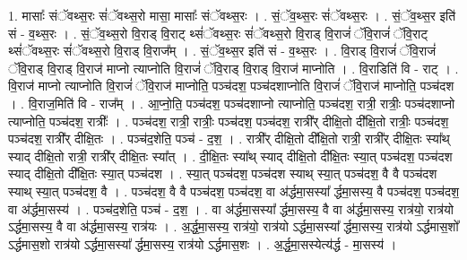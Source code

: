 \documentclass[17pt]{extarticle}
\begin{document}
1. मासाः᳚ संॅवथ्स॒रः सं॑ॅवथ्स॒रो मासा॒ मासाः᳚ संॅवथ्स॒रः । . सं॒ॅव॒थ्स॒रः सं॑ॅवथ्स॒रः । . सं॒ॅव॒थ्स॒र इति॑ सं - व॒थ्स॒रः । . सं॒ॅव॒थ्स॒रो वि॒राड् वि॒राट् थ्सं॑ॅवथ्स॒रः सं॑ॅवथ्स॒रो वि॒राड् वि॒राजं॑ ॅवि॒राजं॑ ॅवि॒राट् 
थ्सं॑ॅवथ्स॒रः सं॑ॅवथ्स॒रो वि॒राड् वि॒राज᳚म् । . सं॒ॅव॒थ्स॒र इति॑ सं - व॒थ्स॒रः । . वि॒राड् वि॒राजं॑ ॅवि॒राजं॑ ॅवि॒राड् वि॒राड् वि॒राज॑ माप्नो त्याप्नोति वि॒राजं॑ ॅवि॒राड् वि॒राड् वि॒राज॑ माप्नोति । . वि॒राडिति॑ वि - राट् । . वि॒राज॑ माप्नो त्याप्नोति वि॒राजं॑ ॅवि॒राज॑ माप्नोति॒ पञ्च॑दश॒ पञ्च॑दशाप्नोति वि॒राजं॑ ॅवि॒राज॑ माप्नोति॒ पञ्च॑दश । . वि॒राज॒मिति॑ वि - राज᳚म् । . आ॒प्नो॒ति॒ पञ्च॑दश॒ पञ्च॑दशाप्नो त्याप्नोति॒ पञ्च॑दश॒ रात्री॒ रात्रीः॒ पञ्च॑दशाप्नो त्याप्नोति॒ पञ्च॑दश॒ रात्रीः᳚ । . पञ्च॑दश॒ रात्री॒ रात्रीः॒ पञ्च॑दश॒ पञ्च॑दश॒ रात्री᳚र् दीक्षि॒तो दी᳚क्षि॒तो रात्रीः॒ पञ्च॑दश॒ पञ्च॑दश॒ रात्री᳚र् दीक्षि॒तः । . पञ्च॑द॒शेति॒ पञ्च॑ - द॒श॒ । . रात्री᳚र् दीक्षि॒तो दी᳚क्षि॒तो रात्री॒ रात्री᳚र् दीक्षि॒तः स्या᳚थ् स्याद् दीक्षि॒तो रात्री॒ रात्री᳚र् दीक्षि॒तः स्या᳚त् । . दी॒क्षि॒तः स्या᳚थ् स्याद् दीक्षि॒तो दी᳚क्षि॒तः स्या॒त् पञ्च॑दश॒ पञ्च॑दश स्याद् दीक्षि॒तो दी᳚क्षि॒तः स्या॒त् पञ्च॑दश । . स्या॒त् पञ्च॑दश॒ पञ्च॑दश स्याथ् स्या॒त् पञ्च॑दश॒ वै वै पञ्च॑दश स्याथ् स्या॒त् पञ्च॑दश॒ वै । . पञ्च॑दश॒ वै वै पञ्च॑दश॒ पञ्च॑दश॒ वा अ॑र्द्धमा॒सस्या᳚ र्द्धमा॒सस्य॒ वै पञ्च॑दश॒ पञ्च॑दश॒ वा अ॑र्द्धमा॒सस्य॑ । . पञ्च॑द॒शेति॒ पञ्च॑ - द॒श॒ । . वा अ॑र्द्धमा॒सस्या᳚ र्द्धमा॒सस्य॒ वै वा अ॑र्द्धमा॒सस्य॒ रात्र॑यो॒ रात्र॑यो ऽर्द्धमा॒सस्य॒ वै वा अ॑र्द्धमा॒सस्य॒ रात्र॑यः । . अ॒र्द्ध॒मा॒सस्य॒ रात्र॑यो॒ रात्र॑यो ऽर्द्धमा॒सस्या᳚ र्द्धमा॒सस्य॒ रात्र॑यो ऽर्द्धमास॒शो᳚ ऽर्द्धमास॒शो रात्र॑यो ऽर्द्धमा॒सस्या᳚ र्द्धमा॒सस्य॒ रात्र॑यो ऽर्द्धमास॒शः । . अ॒र्द्ध॒मा॒सस्येत्य॑र्द्ध - मा॒सस्य॑ । \newline
\end{document}
